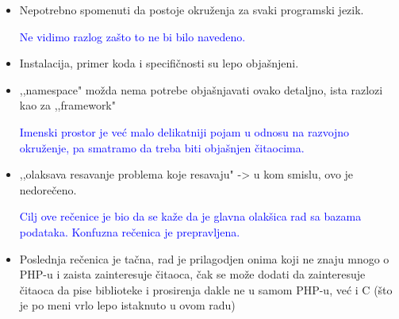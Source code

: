 \documentclass[a4paper]{report}
\newcommand{\odgovor}[1]{\textcolor{blue}{#1}}
\begin{document}
\begin{itemize}
\item Nepotrebno spomenuti da postoje okruženja za svaki programski jezik.

\odgovor{Ne vidimo razlog zašto to ne bi bilo navedeno.}

\item Instalacija, primer koda i specifičnosti su lepo objašnjeni.

\item ,,namespace" možda nema potrebe objašnjavati ovako detaljno, ista razlozi kao za ,,framework"

\odgovor{Imenski prostor je već malo delikatniji pojam u odnosu na razvojno okruženje, pa smatramo da treba biti objašnjen čitaocima. }

\item ,,olaksava resavanje problema koje resavaju" -> u kom smislu, ovo je nedorečeno.

\odgovor{Cilj ove rečenice je bio da se kaže da je glavna olakšica rad sa bazama podataka. Konfuzna rečenica je prepravljena.}

\item Poslednja rečenica je tačna, rad je prilagodjen onima koji ne znaju mnogo o PHP-u i zaista zainteresuje čitaoca, čak se može dodati da zainteresuje čitaoca da pise biblioteke i prosirenja dakle ne u samom PHP-u, već i C (što je po meni vrlo lepo istaknuto u ovom radu)
\end{itemize}
\end{document}

